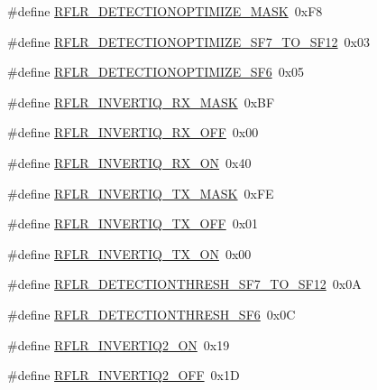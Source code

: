 \begin{DoxyCompactItemize}
\item 
\#define \mbox{\hyperlink{sx1276_regs-_lo_ra_8h_aeb175d9d741f888838066955df3e4edb}{R\+F\+L\+R\+\_\+\+D\+E\+T\+E\+C\+T\+I\+O\+N\+O\+P\+T\+I\+M\+I\+Z\+E\+\_\+\+M\+A\+SK}}~0x\+F8
\item 
\#define \mbox{\hyperlink{sx1276_regs-_lo_ra_8h_ad88e1ef10bcff41afc4074ce1d489320}{R\+F\+L\+R\+\_\+\+D\+E\+T\+E\+C\+T\+I\+O\+N\+O\+P\+T\+I\+M\+I\+Z\+E\+\_\+\+S\+F7\+\_\+\+T\+O\+\_\+\+S\+F12}}~0x03
\item 
\#define \mbox{\hyperlink{sx1276_regs-_lo_ra_8h_aac16a729154e667b90de0819e702433a}{R\+F\+L\+R\+\_\+\+D\+E\+T\+E\+C\+T\+I\+O\+N\+O\+P\+T\+I\+M\+I\+Z\+E\+\_\+\+S\+F6}}~0x05
\item 
\#define \mbox{\hyperlink{sx1276_regs-_lo_ra_8h_acd90b646213ae78994111ee2653940b1}{R\+F\+L\+R\+\_\+\+I\+N\+V\+E\+R\+T\+I\+Q\+\_\+\+R\+X\+\_\+\+M\+A\+SK}}~0x\+BF
\item 
\#define \mbox{\hyperlink{sx1276_regs-_lo_ra_8h_a9c9c9827af6cdbca76caa24df62ccc8e}{R\+F\+L\+R\+\_\+\+I\+N\+V\+E\+R\+T\+I\+Q\+\_\+\+R\+X\+\_\+\+O\+FF}}~0x00
\item 
\#define \mbox{\hyperlink{sx1276_regs-_lo_ra_8h_a2dfdb9bc15c1adca8287a01803ed2672}{R\+F\+L\+R\+\_\+\+I\+N\+V\+E\+R\+T\+I\+Q\+\_\+\+R\+X\+\_\+\+ON}}~0x40
\item 
\#define \mbox{\hyperlink{sx1276_regs-_lo_ra_8h_a105fb2d297f6c79929c49e9af746abe6}{R\+F\+L\+R\+\_\+\+I\+N\+V\+E\+R\+T\+I\+Q\+\_\+\+T\+X\+\_\+\+M\+A\+SK}}~0x\+FE
\item 
\#define \mbox{\hyperlink{sx1276_regs-_lo_ra_8h_a0a85cfee5ae010b871c747d507065d14}{R\+F\+L\+R\+\_\+\+I\+N\+V\+E\+R\+T\+I\+Q\+\_\+\+T\+X\+\_\+\+O\+FF}}~0x01
\item 
\#define \mbox{\hyperlink{sx1276_regs-_lo_ra_8h_aee577d02af06b8226f3e880bd0e06e0c}{R\+F\+L\+R\+\_\+\+I\+N\+V\+E\+R\+T\+I\+Q\+\_\+\+T\+X\+\_\+\+ON}}~0x00
\item 
\#define \mbox{\hyperlink{sx1276_regs-_lo_ra_8h_a0b071b81b299c33f0dc61036cb00b5c8}{R\+F\+L\+R\+\_\+\+D\+E\+T\+E\+C\+T\+I\+O\+N\+T\+H\+R\+E\+S\+H\+\_\+\+S\+F7\+\_\+\+T\+O\+\_\+\+S\+F12}}~0x0A
\item 
\#define \mbox{\hyperlink{sx1276_regs-_lo_ra_8h_a8833cf246a93bf07dca0b0c60fb31eef}{R\+F\+L\+R\+\_\+\+D\+E\+T\+E\+C\+T\+I\+O\+N\+T\+H\+R\+E\+S\+H\+\_\+\+S\+F6}}~0x0C
\item 
\#define \mbox{\hyperlink{sx1276_regs-_lo_ra_8h_a9eb231f472e12e3a0f4ee8b9dd2586b7}{R\+F\+L\+R\+\_\+\+I\+N\+V\+E\+R\+T\+I\+Q2\+\_\+\+ON}}~0x19
\item 
\#define \mbox{\hyperlink{sx1276_regs-_lo_ra_8h_aebe752d4de9fd54dac7d4be3ce195b16}{R\+F\+L\+R\+\_\+\+I\+N\+V\+E\+R\+T\+I\+Q2\+\_\+\+O\+FF}}~0x1D

\end{DoxyCompactItemize}
